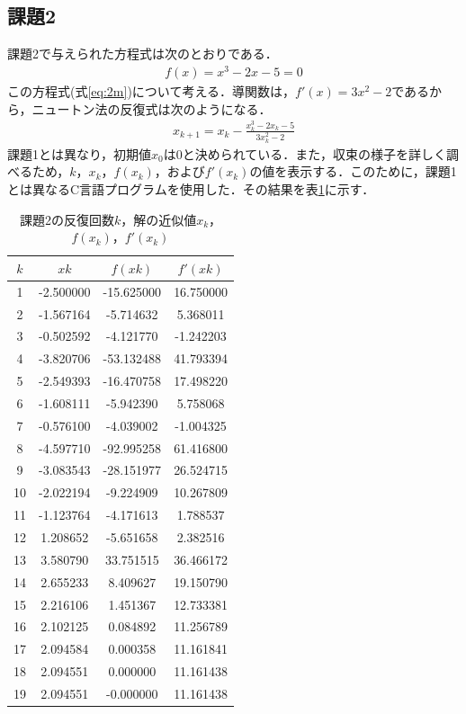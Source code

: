 \documentclass[12pt]{jarticle}
\renewcommand  \[  {\begin{eqnarray}}
\renewcommand  \]  {\end{eqnarray}}
\begin{document}
\subsection{課題2}
課題2で与えられた方程式は次のとおりである．
\[
f(x)=x^3-2x-5 = 0
\label{eq:2m}
\]
この方程式(式\ref{eq:2m})について考える．導関数は，$f\prime(x)=3x^2-2$であるから，ニュートン法の反復式は次のようになる．
\[
x_{k+1}=x_k- \frac{x_k^3-2x_k-5}{3x_k^2-2}
\label{eq:2}
\]
課題1とは異なり，初期値$x_0$は$0$と決められている．また，収束の様子を詳しく調べるため，$k$，$x_k$，$f(x_k)$，および$f\prime(x_k)$の値を表示する．このために，課題1とは異なるC言語プログラムを使用した．その結果を表\ref{tab:2}に示す．
\begin{table}[t]
\caption{課題2の反復回数$k$，解の近似値$x_k$，$f(x_k)$，$f\prime(x_k)$}
\label{tab:2}
\center
\begin{tabular}{|c|c|c|c|}
\hline
$k$ & $xk$ & $f(xk)$ & $f'(xk)$\\
\hline
1 & -2.500000 & -15.625000 & 16.750000 \\
2 & -1.567164 & -5.714632 & 5.368011 \\
3 & -0.502592 & -4.121770 & -1.242203 \\
4 & -3.820706 & -53.132488 & 41.793394 \\
5 & -2.549393 & -16.470758 & 17.498220 \\
6 & -1.608111 & -5.942390 & 5.758068 \\
7 & -0.576100 & -4.039002 & -1.004325 \\
8 & -4.597710 & -92.995258 & 61.416800 \\
9 & -3.083543 & -28.151977 & 26.524715 \\
10 & -2.022194 & -9.224909 & 10.267809 \\
11 & -1.123764 & -4.171613 & 1.788537 \\
12 & 1.208652 & -5.651658 & 2.382516 \\
13 & 3.580790 & 33.751515 & 36.466172 \\
14 & 2.655233 & 8.409627 & 19.150790 \\
15 & 2.216106 & 1.451367 & 12.733381 \\
16 & 2.102125 & 0.084892 & 11.256789 \\
17 & 2.094584 & 0.000358 & 11.161841 \\
18 & 2.094551 & 0.000000 & 11.161438 \\
19 & 2.094551 & -0.000000 & 11.161438 \\
\hline
\end{tabular}
\end{table}
\end{document}
